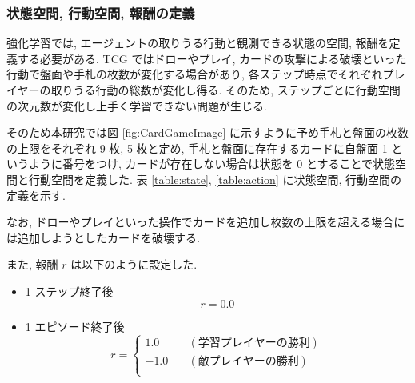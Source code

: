 \documentclass[12pt]{jarticle}
\begin{document}
\subsubsection{状態空間, 行動空間, 報酬の定義}
強化学習では, エージェントの取りうる行動と観測できる状態の空間, 報酬を定義する必要がある. 
TCG ではドローやプレイ, カードの攻撃による破壊といった行動で盤面や手札の枚数が変化する場合があり, 各ステップ時点でそれぞれプレイヤーの取りうる行動の総数が変化し得る. そのため, ステップごとに行動空間の次元数が変化し上手く学習できない問題が生じる. \par
そのため本研究では図 \ref{fig:CardGameImage} に示すように予め手札と盤面の枚数の上限をそれぞれ 9 枚, 5 枚と定め, 手札と盤面に存在するカードに自盤面 1 というように番号をつけ, カードが存在しない場合は状態を 0 とすることで状態空間と行動空間を定義した. 表 \ref{table:state}, \ref{table:action} に状態空間, 行動空間の定義を示す. \par
なお, ドローやプレイといった操作でカードを追加し枚数の上限を超える場合には追加しようとしたカードを破壊する.
\par
また, 報酬 $r$ は以下のように設定した.\par
\begin{itemize}
  \vspace{-0.3cm}
  \item 1 ステップ終了後 
  \begin{equation*}
   r = 0.0  
  \end{equation*}
  \item 1 エピソード終了後
  \begin{equation*}
    r = 
    \left\{
      \begin{aligned}
          1.0 \quad & (\mathrm{学習プレイヤーの勝利}) \\
          -1.0 \quad & (\mathrm{敵プレイヤーの勝利}) \\
      \end{aligned}
    \right.
  \end{equation*} 
\end{itemize}
\end{document}
